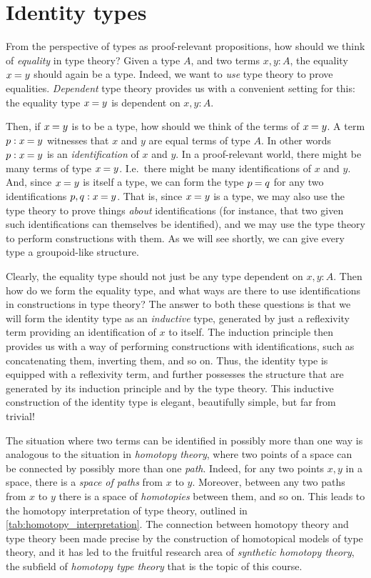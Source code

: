 \chapter{Identity types}
From the perspective of types as proof-relevant propositions, how should we think of \emph{equality} in type theory? Given a type $A$, and two terms $x,y:A$, the equality $\id{x}{y}$ should again be a type. Indeed, we want to \emph{use} type theory to prove equalities. \emph{Dependent} type theory provides us with a convenient setting for this: the equality type $\id{x}{y}$ is dependent on $x,y:A$. 

Then, if $\id{x}{y}$ is to be a type, how should we think of the terms of $\id{x}{y}$. A term $p:\id{x}{y}$ witnesses that $x$ and $y$ are equal terms of type $A$. In other words $p:\id{x}{y}$ is an \emph{identification} of $x$ and $y$. In a proof-relevant world, there might be many terms of type $\id{x}{y}$. I.e.~there might be many identifications of $x$ and $y$. And, since $\id{x}{y}$ is itself a type, we can form the type $\id{p}{q}$ for any two identifications $p,q:\id{x}{y}$. That is, since $\id{x}{y}$ is a type, we may also use the type theory to prove things \emph{about} identifications (for instance, that two given such identifications can themselves be identified), and we may use the type theory to perform constructions with them. As we will see shortly, we can give every type a groupoid-like structure.

Clearly, the equality type should not just be any type dependent on $x,y:A$. Then how do we form the equality type, and what ways are there to use identifications in constructions in type theory? The answer to both these questions is that we will form the identity type as an \emph{inductive} type, generated by just a reflexivity term providing an identification of $x$ to itself. The induction principle then provides us with a way of performing constructions with identifications, such as concatenating them, inverting them, and so on. Thus, the identity type is equipped with a reflexivity term, and further possesses the structure that are generated by its induction principle and by the type theory. This inductive construction of the identity type is elegant, beautifully simple, but far from trivial!

The situation where two terms can be identified in possibly more than one way is analogous to the situation in \emph{homotopy theory}, where two points of a space can be connected by possibly more than one \emph{path}. Indeed, for any two points $x,y$ in a space, there is a \emph{space of paths} from $x$ to $y$. Moreover, between any two paths from $x$ to $y$ there is a space of \emph{homotopies} between them, and so on. This leads to the homotopy interpretation of type theory, outlined in \cref{tab:homotopy_interpretation}. The connection between homotopy theory and type theory been made precise by the construction of homotopical models of type theory, and it has led to the fruitful research area of \emph{synthetic homotopy theory}, the subfield of \emph{homotopy type theory} that is the topic of this course.

